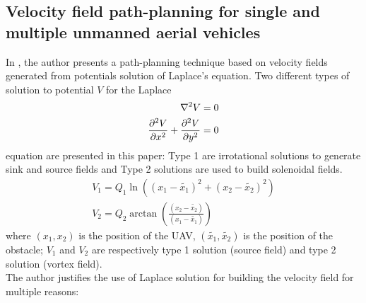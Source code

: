 \subsection{Velocity field path-planning for single and multiple unmanned aerial vehicles}
In \cite{farinha2020unmanned}, the author presents a path-planning technique based on velocity fields generated from potentials solution of Laplace's equation.
Two different types of solution to potential $V$ for the Laplace 
\begin{align} %
    \laplacian{V} &=0 \nonumber \\
    \frac{\partial^2 V}{\partial x^2}+\dpd[2]{V}{y} &=0 \label{eq:Laplace} %
\end{align}
equation are presented in this paper: Type 1 are irrotational solutions to generate sink and source fields and Type 2 solutions are used to build solenoidal fields.
\begin{align} %
    {V}_{1} = {Q}_{1} \ln(({x}_{1}-\tilde{{x}_{1}})^2+({x}_{2}-\tilde{{x}_{2}})^2) \\
    {V}_{2} = {Q}_{2} \arctan(\frac{({x}_{2}-\tilde{{x}_{2}})}{({x}_{1}-\tilde{{x}_{1}})})
\end{align}
where $({x}_{1},{x}_{2})$ is the position of the UAV, $(\tilde{{x}_{1}}, \tilde{{x}_{2}})$ is the position of the obstacle;
${V}_{1}$ and ${V}_{2}$ are respectively type 1 solution (source field) and type 2 solution (vortex field). \\
The author justifies the use of Laplace solution for building the velocity field for multiple reasons:
